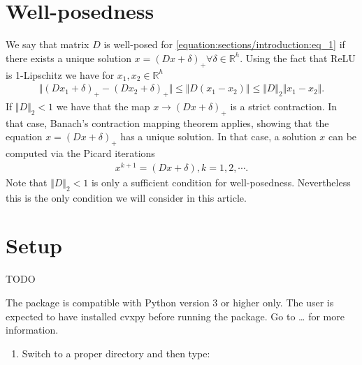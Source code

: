 \documentclass[letterpaper,10pt,english]{sphinxmanual}
\begin{document}
\section{Well-posedness}
\label{\detokenize{sections/introduction:well-posedness}}
We say that matrix \(D\) is well-posed for \eqref{equation:sections/introduction:eq_1} if there exists a unique solution \(x = (Dx + \delta)_+ \forall \delta \in \mathbb{R}^h\).
Using the fact that ReLU is 1-Lipschitz we have for \(x_1,x_2 \in \mathbb{R}^h\)
\begin{equation*}
\begin{split}\Vert (Dx_1 + \delta)_+ - (Dx_2 + \delta)_+ \Vert \leq \Vert D(x_1 -x_2) \Vert \leq \Vert D \Vert_2 \Vert x_1 -x_2 \Vert.\end{split}
\end{equation*}
If \(\Vert D \Vert_2 < 1\) we have that the map \(x \rightarrow (Dx + \delta)_+\) is a strict contraction. In that case, Banach’s contraction
mapping theorem applies, showing that the equation \(x = (Dx + \delta)_+\) has a unique solution. In that case, a solution \(x\) can be computed via the
Picard iterations
\begin{equation*}
\begin{split}x^{k+1} = (Dx + \delta), k = 1,2, \cdots.\end{split}
\end{equation*}
Note that \(\Vert D \Vert_2 < 1\) is only a sufficient condition for well-posedness. Nevertheless this is the only condition
we will consider in this article.


\section{Setup}
\label{\detokenize{sections/introduction:setup}}
TODO

The package is compatible with Python version 3 or higher only.
The user is expected to have installed cvxpy before running the package.
Go to … for more information.
\begin{enumerate}
%
\item {} 
Switch to a proper directory and then type:

\end{enumerate}

\begin{sphinxVerbatim}[commandchars=\\\{\}]
   
\end{sphinxVerbatim}
\end{document}
